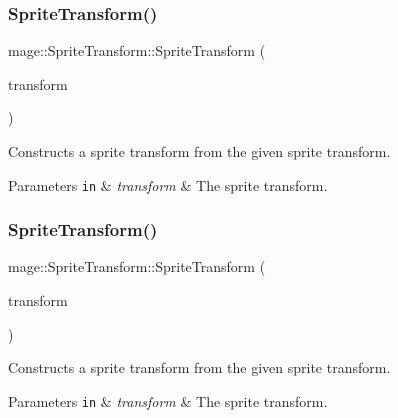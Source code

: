 \subsubsection{\texorpdfstring{Sprite\+Transform()}{SpriteTransform()}\hspace{0.1cm}{\footnotesize\ttfamily [2/3]}}
{\footnotesize\ttfamily mage\+::\+Sprite\+Transform\+::\+Sprite\+Transform (\begin{DoxyParamCaption}\item[{const \hyperlink{structmage_1_1_sprite_transform}{Sprite\+Transform} \&}]{transform }\end{DoxyParamCaption})\hspace{0.3cm}{\ttfamily [default]}}

Constructs a sprite transform from the given sprite transform.


\begin{DoxyParams}[1]{Parameters}
\mbox{\tt in}  & {\em transform} & The sprite transform. \\
\hline
\end{DoxyParams}
\hypertarget{structmage_1_1_sprite_transform_a53d7da4498f4f9f67be2994eb4593c3a}{}\label{structmage_1_1_sprite_transform_a53d7da4498f4f9f67be2994eb4593c3a} 
\subsubsection{\texorpdfstring{Sprite\+Transform()}{SpriteTransform()}\hspace{0.1cm}{\footnotesize\ttfamily [3/3]}}
{\footnotesize\ttfamily mage\+::\+Sprite\+Transform\+::\+Sprite\+Transform (\begin{DoxyParamCaption}\item[{\hyperlink{structmage_1_1_sprite_transform}{Sprite\+Transform} \&\&}]{transform }\end{DoxyParamCaption})\hspace{0.3cm}{\ttfamily [default]}}

Constructs a sprite transform from the given sprite transform.


\begin{DoxyParams}[1]{Parameters}
\mbox{\tt in}  & {\em transform} & The sprite transform. \\
\hline
\end{DoxyParams}
\hypertarget{structmage_1_1_sprite_transform_a14a3614023996cbb071c3de99f9528bc}{}\label{structmage_1_1_sprite_transform_a14a3614023996cbb071c3de99f9528bc} 
